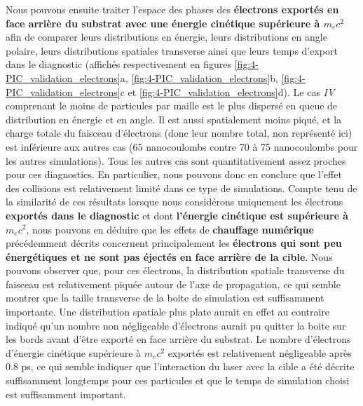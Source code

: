 \begin{refsection}
Nous pouvons ensuite traiter l'espace des phases des \textbf{électrons exportés en face arrière du substrat avec une énergie cinétique supérieure à $m_e c^2$} afin de comparer leurs distributions en énergie, leurs distributions en angle polaire, leurs distributions spatiales transverse ainsi que leurs temps d'export dans le diagnostic (affichés respectivement en figures \ref{fig:4-PIC_validation_electrons}a, \ref{fig:4-PIC_validation_electrons}b, \ref{fig:4-PIC_validation_electrons}c et \ref{fig:4-PIC_validation_electrons}d).
Le cas \textit{IV} comprenant le moins de particules par maille est le plus dispersé en queue de distribution en énergie et en angle. Il est aussi spatialement moins piqué, et la charge totale du faisceau d'électrons (donc leur nombre total, non représenté ici) est inférieure aux autres cas (65 nanocoulombs contre 70 à 75 nanocoulombs pour les autres simulations). 
Tous les autres cas sont quantitativement assez proches pour ces diagnostics. En particulier, nous pouvons donc en conclure que l'effet des collisions est relativement limité dans ce type de simulations. Compte tenu de la similarité de ces résultats lorsque nous considérons uniquement les électrons \textbf{exportés dans le diagnostic} et dont \textbf{l'énergie cinétique est supérieure à $m_e c^2$}, nous pouvons en déduire que les effets de \textbf{chauffage numérique} précédemment décrits concernent principalement les \textbf{électrons qui sont peu énergétiques et ne sont pas éjectés en face arrière de la cible}. 
Nous pouvons observer que, pour ces électrons, la distribution spatiale transverse du faisceau est relativement piquée autour de l'axe de propagation, ce qui semble montrer que la taille transverse de la boite de simulation est suffisamment importante. Une distribution spatiale plus plate aurait en effet au contraire indiqué qu'un nombre non négligeable d'électrons aurait pu quitter la boite sur les bords avant d'être exporté en face arrière du substrat. 
Le nombre d'électrons d'énergie cinétique supérieure à $m_e c^2$ exportés est relativement négligeable après $0.8$ ps, ce qui semble indiquer que l'interaction du laser avec la cible a été décrite suffisamment longtemps pour ces particules et que le temps de simulation choisi est suffisamment important. 


\end{refsection}

